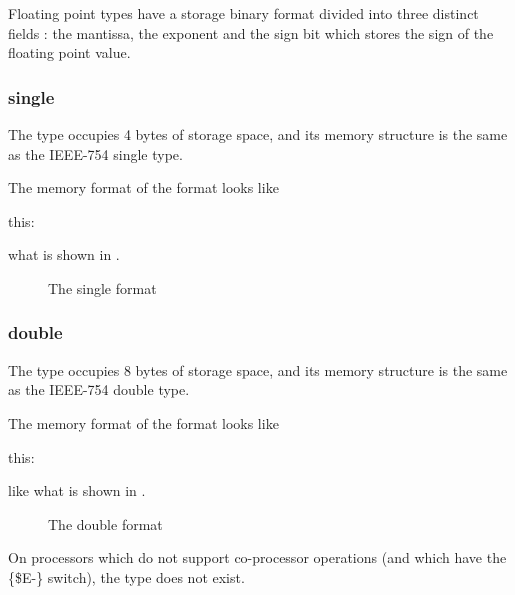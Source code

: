 Floating point types have a storage binary format divided
into three distinct fields : the mantissa, the exponent
and the sign bit which stores the sign of the floating
point value.

\subsubsection{single}

The  type occupies 4 bytes of storage space,
and its memory structure is the same as the IEEE-754 single
type.

The memory format of the  format looks like
\begin{htmlonly}
this:
\end{htmlonly}
\begin{latexonly}
what is shown in .
\begin{figure}
\caption{The single format}
\label{fig:singleformat}
\begin{center}
\ifpdf
{}
\else
{}
\fi
\end{center}
\end{figure}
\end{latexonly}


\subsubsection{double}

The  type occupies 8 bytes of storage space,
and its memory structure is the same as the IEEE-754 double
type.

The memory format of the  format looks like
\begin{htmlonly}
this:
\end{htmlonly}
\begin{latexonly}
like what is shown in .
\begin{figure}
\begin{center}
\caption{The double format}
\label{fig:doubleformat}
\ifpdf
{}
\else
{}
\fi
\end{center}
\end{figure}
\end{latexonly}


On processors which do not support co-processor operations (and which have
the \{\$E-\} switch), the  type does not exist.



